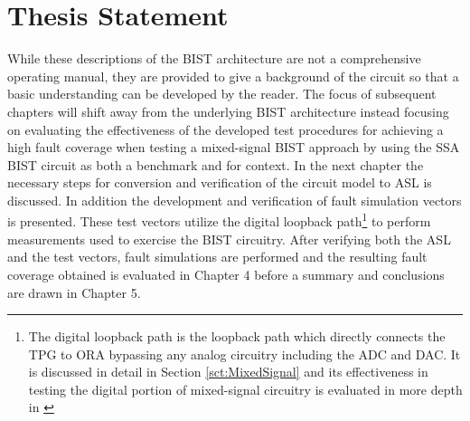 \documentclass[12pt]{report}
\begin{document}
\section{Thesis Statement}
While these descriptions of the BIST architecture are not a comprehensive operating manual, they are provided to give a background of the circuit so that a basic understanding can be developed by the reader.  The focus of subsequent chapters will shift away from the underlying BIST architecture instead focusing on evaluating the effectiveness of the developed test procedures for achieving a high fault coverage when testing a mixed-signal BIST approach by using the SSA BIST circuit as both a benchmark and for context.  In the next chapter the necessary steps for conversion and verification of the circuit model to ASL is discussed.  In addition the development and verification of fault simulation vectors is presented.  These test vectors utilize the digital loopback path\footnote{The digital loopback path is the loopback path which directly connects the TPG to ORA bypassing any analog circuitry including the ADC and DAC.  It is discussed in detail in Section \ref{sct:MixedSignal} and its effectiveness in testing the digital portion of mixed-signal circuitry is evaluated in more depth in \cite{stroud-analog}} to perform measurements used to exercise the BIST circuitry.  After verifying both the ASL and the test vectors, fault simulations are performed and the resulting fault coverage obtained is evaluated in Chapter 4 before a summary and conclusions are drawn in Chapter 5. 
\end{document}
